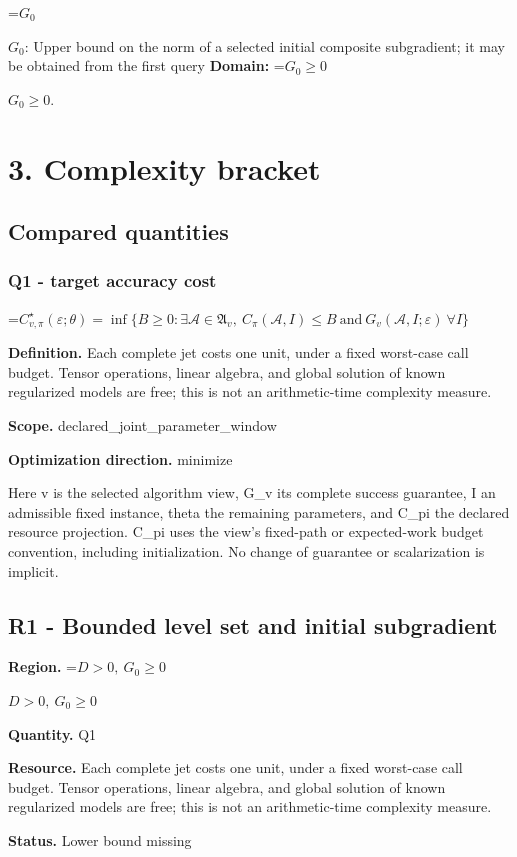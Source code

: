 \documentclass[10pt,a4paper]{article}
\newcommand{\AtlasMath}[1]{\par\begingroup\centering\setbox0=\hbox{$\displaystyle #1$}\ifdim\wd0>1.4\linewidth\typeout{ATLAS WIDE FORMULA: \the\wd0}\fi\ifdim\wd0>\linewidth\resizebox{\linewidth}{!}{\box0}\else\box0\fi\par\endgroup}
\newcommand{\AtlasInlineMath}[1]{\begingroup\setbox0=\hbox{$#1$}\ifdim\wd0>.4\linewidth\endgroup\AtlasMath{#1}\else\endgroup$#1$\fi}
\begin{document}
\AtlasInlineMath{G_0}: Upper bound on the norm of a selected initial composite subgradient; it may be obtained from the first query \textbf{Domain:} \AtlasInlineMath{G_0\ge0}.

\section{3. Complexity bracket}
\subsection{Compared quantities}
\subsubsection{Q1 - target accuracy cost}
\AtlasMath{C^\star_{v,\pi}(\varepsilon;\theta)=\inf\{B\ge0:\exists\mathcal A\in\mathfrak A_v,\ C_\pi(\mathcal A,I)\le B\ \text{and}\ G_v(\mathcal A,I;\varepsilon)\ \forall I\}}
\textbf{Definition.} Each complete jet costs one unit, under a fixed worst-case call budget. Tensor operations, linear algebra, and global solution of known regularized models are free; this is not an arithmetic-time complexity measure.

\textbf{Scope.} declared\_joint\_parameter\_window

\textbf{Optimization direction.} minimize

Here v is the selected algorithm view, G\_v its complete success guarantee, I an admissible fixed instance, theta the remaining parameters, and C\_pi the declared resource projection. C\_pi uses the view's fixed-path or expected-work budget convention, including initialization. No change of guarantee or scalarization is implicit.

\subsection{R1 - Bounded level set and initial subgradient}
\textbf{Region.} \AtlasInlineMath{D>0,\ G_0\ge0}

\textbf{Quantity.} Q1

\textbf{Resource.} Each complete jet costs one unit, under a fixed worst-case call budget. Tensor operations, linear algebra, and global solution of known regularized models are free; this is not an arithmetic-time complexity measure.

\textbf{Status.} Lower bound missing
\end{document}
